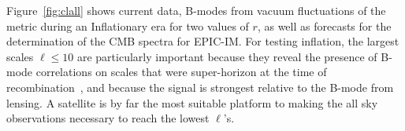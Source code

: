 Figure~\ref{fig:clall} shows current data, B-modes from vacuum fluctuations of the metric during an Inflationary 
era for two values of $r$, as well as forecasts for the determination of the \ac{CMB} spectra for EPIC-IM. 
For testing inflation, the largest scales $\ell \leq 10$ are particularly important because they reveal 
the presence of B-mode correlations on scales that were super-horizon at the time of recombination~\cite{Lee:2014cya}, 
and because the signal is strongest relative to the B-mode from lensing. A satellite is by far the most suitable 
platform to making the all sky observations necessary to reach the lowest $\ell$'s. 

